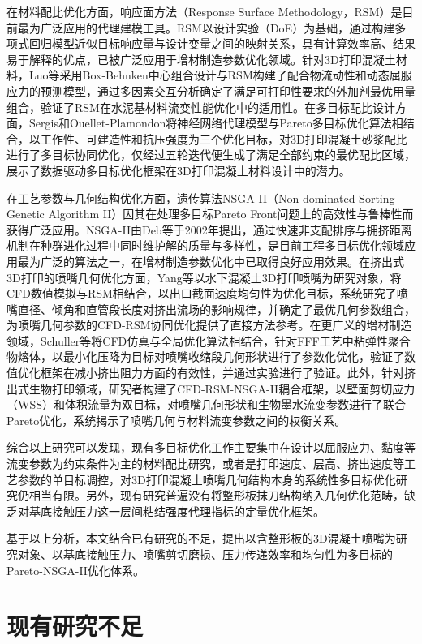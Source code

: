 在材料配比优化方面，响应面方法（Response Surface Methodology，RSM）是目前最为广泛应用的代理建模工具。RSM以设计实验（DoE）为基础，通过构建多项式回归模型近似目标响应量与设计变量之间的映射关系，具有计算效率高、结果易于解释的优点，已被广泛应用于增材制造参数优化领域。针对3D打印混凝土材料，Luo等\cite{luo2025}采用Box-Behnken中心组合设计与RSM构建了配合物流动性和动态屈服应力的预测模型，通过多因素交互分析确定了满足可打印性要求的外加剂最优用量组合，验证了RSM在水泥基材料流变性能优化中的适用性。在多目标配比设计方面，Sergis和Ouellet-Plamondon\cite{sergis2022}将神经网络代理模型与Pareto多目标优化算法相结合，以工作性、可建造性和抗压强度为三个优化目标，对3D打印混凝土砂浆配比进行了多目标协同优化，仅经过五轮迭代便生成了满足全部约束的最优配比区域，展示了数据驱动多目标优化框架在3D打印混凝土材料设计中的潜力。

在工艺参数与几何结构优化方面，遗传算法NSGA-II（Non-dominated Sorting Genetic Algorithm II）因其在处理多目标Pareto Front问题上的高效性与鲁棒性而获得广泛应用\cite{deb2002}。NSGA-II由Deb等于2002年提出，通过快速非支配排序与拥挤距离机制在种群进化过程中同时维护解的质量与多样性，是目前工程多目标优化领域应用最为广泛的算法之一，在增材制造参数优化中已取得良好应用效果\cite{deb2002}。在挤出式3D打印的喷嘴几何优化方面，Yang等\cite{yang2025}以水下混凝土3D打印喷嘴为研究对象，将CFD数值模拟与RSM相结合，以出口截面速度均匀性为优化目标，系统研究了喷嘴直径、倾角和直管段长度对挤出流场的影响规律，并确定了最优几何参数组合，为喷嘴几何参数的CFD-RSM协同优化提供了直接方法参考。在更广义的增材制造领域，Schuller等\cite{schuller2024}将CFD仿真与全局优化算法相结合，针对FFF工艺中粘弹性聚合物熔体，以最小化压降为目标对喷嘴收缩段几何形状进行了参数化优化，验证了数值优化框架在减小挤出阻力方面的有效性，并通过实验进行了验证。此外，针对挤出式生物打印领域，研究者构建了CFD-RSM-NSGA-II耦合框架，以壁面剪切应力（WSS）和体积流量为双目标，对喷嘴几何形状和生物墨水流变参数进行了联合Pareto优化，系统揭示了喷嘴几何与材料流变参数之间的权衡关系\cite{ardaneh2026}。

综合以上研究可以发现，现有多目标优化工作主要集中在设计以屈服应力、黏度等流变参数为约束条件为主的材料配比研究，或者是打印速度、层高、挤出速度等工艺参数的单目标调控，对3D打印混凝土喷嘴几何结构本身的系统性多目标优化研究仍相当有限。另外，现有研究普遍没有将整形板抹刀结构纳入几何优化范畴，缺乏对基底接触压力这一层间粘结强度代理指标的定量优化框架。

基于以上分析，本文结合已有研究的不足，提出以含整形板的3D混凝土喷嘴为研究对象、以基底接触压力、喷嘴剪切磨损、压力传递效率和均匀性为多目标的Pareto-NSGA-II优化体系。

\section{现有研究不足}

